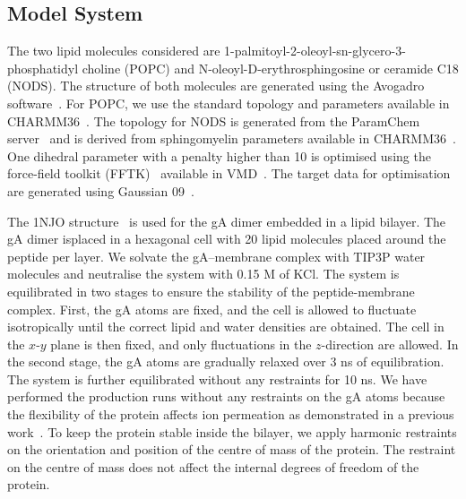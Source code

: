 \subsection{Model System}
The two lipid molecules considered are 1-palmitoyl-2-oleoyl-sn-glycero-3-phosphatidyl choline 
(POPC) and N-oleoyl-D-erythrosphingosine or ceramide C18 (NODS). The structure of both molecules 
are generated using the Avogadro software~\cite{Hanwell2012}. For POPC, we use the standard 
topology and parameters available in CHARMM36~\cite{Brooks2009}. The topology for NODS is generated 
from the ParamChem server~\cite{Vanommeslaeghe2012a,Vanommeslaeghe2012} and is derived from 
sphingomyelin parameters available in CHARMM36~\cite{Venable2014}. One dihedral parameter with a 
penalty higher than 10 is optimised using the force-field toolkit (FFTK)~\cite{Mayne2013} available 
in VMD~\cite{Humphrey1996}. The target data for optimisation are generated using Gaussian 
09~\cite{Frisch2009}.

The 1NJO structure~\cite{Townsley2001} is used for the gA dimer embedded in a lipid bilayer. The gA 
dimer isplaced in a hexagonal cell with 20 lipid molecules placed around the peptide per layer. We 
solvate the gA–membrane complex with TIP3P water molecules and neutralise the system with 0.15 M 
of KCl. The system is equilibrated in two stages to ensure the stability of the peptide-membrane 
complex. First, the gA atoms are fixed, and the cell is allowed to fluctuate isotropically until the 
correct lipid and water densities are obtained. The cell in the $x$-$y$ plane is then fixed, and only 
fluctuations in the $z$-direction are allowed. In the second stage, the gA atoms are gradually relaxed 
over 3 ns of equilibration. The system is further equilibrated without any restraints for 10 ns. We 
have performed the production runs without any restraints on the gA atoms because the flexibility of 
the protein affects ion permeation as demonstrated in a previous work~\cite{Bastug2006a}. To keep 
the protein stable inside the bilayer, we apply harmonic restraints on the orientation and position 
of the centre of mass of the protein. The restraint on the centre of mass does not affect the 
internal degrees of freedom of the protein.

